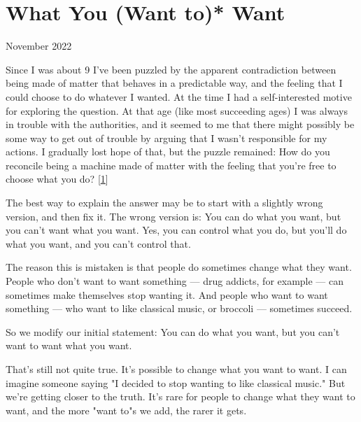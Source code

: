 \chapter{What You (Want to)* Want}


            
              
                

November 2022

Since I was about 9 I've been
                  puzzled by the apparent contradiction between being made of
                  matter that behaves in a predictable way, and the feeling that
                  I could choose to do whatever I wanted. At the time I had a
                  self-interested motive for exploring the question. At that age
                  (like most succeeding ages) I was always in trouble with the
                  authorities, and it seemed to me that there might possibly be
                  some way to get out of trouble by arguing that I wasn't
                  responsible for my actions. I gradually lost hope of that, but
                  the puzzle remained: How do you reconcile being a machine made
                  of matter with the feeling that you're free to choose what you
                  do?
                  [\href{\#f1n}{1}]

The best way to explain the answer may be to
                  start with a slightly wrong version, and then fix it. The
                  wrong version is: You can do what you want, but you can't want
                  what you want. Yes, you can control what you do, but you'll do
                  what you want, and you can't control that.

The
                  reason this is mistaken is that people do sometimes change
                  what they want. People who don't want to want something
                  --- drug addicts, for example --- can sometimes make
                  themselves stop wanting it. And people who want to want
                  something --- who want to like classical music, or
                  broccoli --- sometimes succeed.

So we modify
                  our initial statement: You can do what you want, but you can't
                  want to want what you want.

That's still not quite
                  true. It's possible to change what you want to want. I can
                  imagine someone saying "I decided to stop wanting to like
                  classical music." But we're getting closer to the truth. It's
                  rare for people to change what they want to want, and the more
                  "want to"s we add, the rarer it gets.

